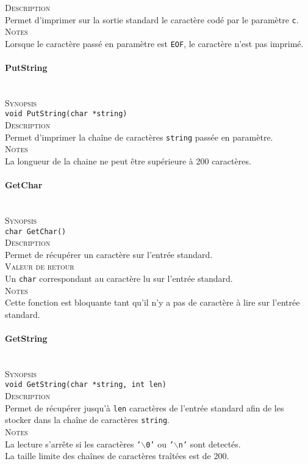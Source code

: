 \documentclass{report}
\newcommand{\myparagraph}[1]{\paragraph*{#1}\mbox{}\\}
\begin{document}
\textsc{Description}\\
	Permet d'imprimer sur la sortie standard le caractère codé par le paramètre \texttt{c}.\\
	
\textsc{Notes}\\
	Lorsque le caractère passé en paramètre est \texttt{EOF}, le caractère n'est pas imprimé.




\myparagraph{PutString}

\textsc{Synopsis}\\
	\texttt{void PutString(char *string)}\\
	
\textsc{Description}\\
	Permet d'imprimer la chaîne de caractères \texttt{string} passée en paramètre.\\
	
\textsc{Notes}\\
	La longueur de la chaine ne peut être supérieure à 200 caractères.


\myparagraph{GetChar}

\textsc{Synopsis}\\
	\texttt{char GetChar()}\\
	
\textsc{Description}\\
	Permet de récupérer un caractère sur l'entrée standard.\\
	
\textsc{Valeur de retour}\\
	Un \texttt{char} correspondant au caractère lu sur l'entrée standard.\\
	
\textsc{Notes}\\
	Cette fonction est bloquante tant qu'il n'y a pas de caractère à lire sur l'entrée standard.
	



\myparagraph{GetString}

\textsc{Synopsis}\\
	\texttt{void GetString(char *string, int len)}\\
	
\textsc{Description}\\
	Permet de récupérer jusqu'à \texttt{len} caractères de l'entrée standard afin de les stocker dans la chaîne de caractères \texttt{string}.\\
	
\textsc{Notes}\\
	La lecture s'arrête si les caractères \texttt{'$\backslash$0'} ou \texttt{'$\backslash$n'} sont detectés.\\
	La taille limite des chaînes de caractères traîtées est de 200.	\\
	
\end{document}
